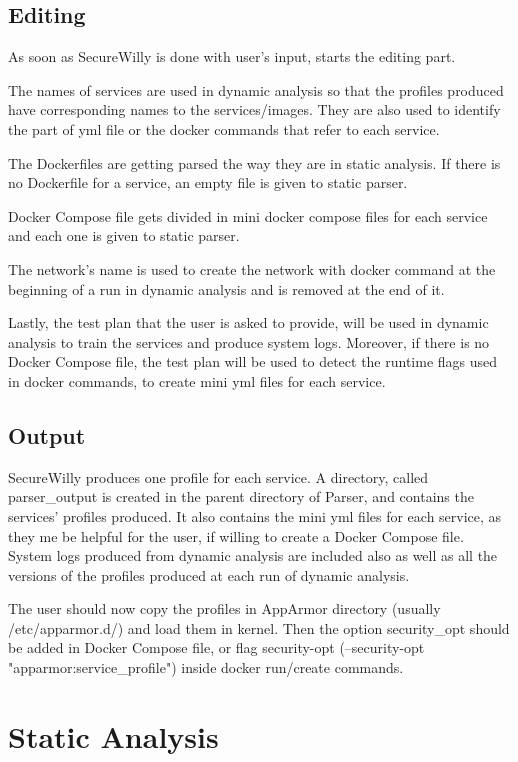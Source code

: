\subsection{Editing}
As soon as SecureWilly is done with user's input, starts the editing part.

The names of services are used in dynamic analysis so that the profiles produced have corresponding names to the services/images. They are also used to identify the part of yml file or the docker commands that refer to each service. 

The Dockerfiles are getting parsed the way they are in static analysis. If there is no Dockerfile for a service, an empty file is given to static parser.

Docker Compose file gets divided in mini docker compose files for each service and each one is given to static parser.

The network's name is used to create the network with docker command at the beginning of a run in dynamic analysis and is removed at the end of it.

Lastly, the test plan that the user is asked to provide, will be used in dynamic analysis to train the services and produce system logs. Moreover, if there is no Docker Compose file, the test plan will be used to detect the runtime flags used in docker commands, to create mini yml files for each service.

\subsection{Output}
SecureWilly produces one profile for each service. A directory, called parser\_output is created in the parent directory of Parser, and contains the services' profiles produced. It also contains the mini yml files for each service, as they me be helpful for the user, if willing to create a Docker Compose file. System logs produced from dynamic analysis are included also as well as all the versions of the profiles produced at each run of dynamic analysis.

The user should now copy the profiles in AppArmor directory (usually /etc/apparmor.d/) and load them in kernel. Then the option security\_opt should be added in Docker Compose file, or flag security-opt (--security-opt "apparmor:service\_profile") inside docker run/create commands.

\section{Static Analysis}
